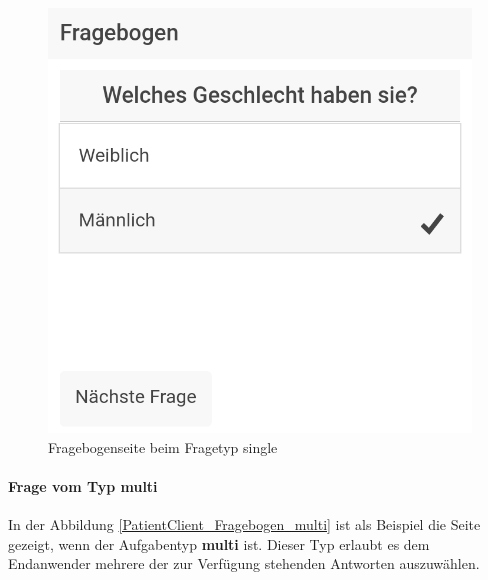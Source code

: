\begin{figure}[H]
	\centering
	\includegraphics[scale=0.3]{images/Screenshots/PatientClient/Fragebogen_single}
	\caption[Fragebogenseite beim Fragetyp single]{Fragebogenseite beim Fragetyp single}
	\label{PatientClient_Fragebogen_single}
\end{figure}
\newpage 
\paragraph{Frage vom Typ multi}
In der Abbildung \ref{PatientClient_Fragebogen_multi} ist als Beispiel die Seite gezeigt, wenn der Aufgabentyp \textbf{multi} ist. Dieser Typ erlaubt es dem Endanwender mehrere der zur Verfügung stehenden Antworten auszuwählen.

